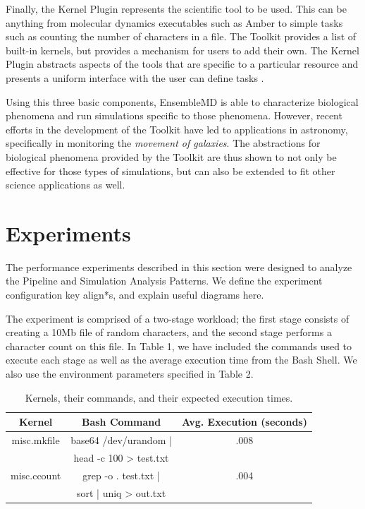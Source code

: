\documentclass[]{article}
\begin{document}
			Finally, the Kernel Plugin represents the scientific tool to be used. This can be anything from molecular dynamics executables such as Amber to simple tasks such as counting the number of characters in a file. The Toolkit provides a list of built-in kernels, but provides a mechanism for users to add their own. The Kernel Plugin abstracts aspects of the tools that are specific to a particular resource and presents a uniform interface with the user can define tasks \cite{enmd_paper}.

			Using this three basic components, EnsembleMD is able to characterize biological phenomena and run simulations specific to those phenomena. However, recent efforts in the development of the Toolkit have led to applications in astronomy, specifically in monitoring the \textit{movement of galaxies}. The abstractions for biological phenomena provided by the Toolkit are thus shown to not only be effective for those types of simulations, but can also be extended to fit other science applications as well.

\section{Experiments}
	The performance experiments described in this section were designed to analyze the Pipeline and Simulation Analysis Patterns. We define the experiment configuration key align*s, and explain useful diagrams here.

	The experiment is comprised of a two-stage workload; the first stage consists of creating a 10Mb file of random characters, and the second stage performs a character count on this file. In Table 1, we have included the commands used to execute each stage as well as the average execution time from the Bash Shell. We also use the environment parameters specified in Table 2.

	\begin{table}[H]
		\centering
		\begin{tabu}{|c|c|c|}
			\hline
			Kernel & Bash Command & Avg. Execution (seconds) \\
			\hline
			misc.mkfile & base64 /dev/urandom | & .008 \\ 
						& head -c 100 > test.txt  \\
			\hline
			misc.ccount & grep -o . test.txt |  & .004\\ 
						& sort | uniq > out.txt   \\
			\hline
		\end{tabu}
		\caption{Kernels, their commands, and their expected execution times.}
		\label{table:kernel_execution_table}
	\end{table}
\end{document}
